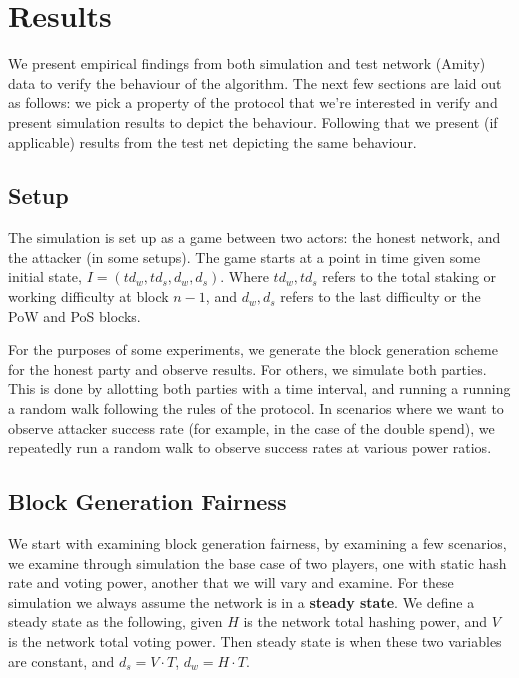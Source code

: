 \section{Results}
\label{results}

We present empirical findings from both simulation and test network (Amity) data
to verify the behaviour of the algorithm. The next few sections are laid out as
follows: we pick a property of the protocol that we're interested in verify and
present simulation results to depict the behaviour. Following that we present 
(if applicable) results from the test net depicting the same behaviour.

\subsection{Setup}

The simulation is set up as a game between two actors: the honest network, and
the attacker (in some setups). The game starts at a point in time given some initial state,
$I=(td_w,td_s,d_w,d_s)$. Where $td_w, td_s$ refers to the total staking or
working difficulty at block $n-1$, and $d_w, d_s$ refers to the last difficulty
or the PoW and PoS blocks.

For the purposes of some experiments, we generate the block generation scheme
for the honest party and observe results. For others, we simulate both parties. This
is done by allotting both parties with a time interval, and running a running a
random walk following the rules of the protocol. In scenarios where we want to
observe attacker success rate (for example, in the case of the double spend), we
repeatedly run a random walk to observe success rates at various power ratios.

\subsection{Block Generation Fairness}

We start with examining block generation fairness, by examining a few scenarios,
we examine through simulation the base case of two players, one with static
hash rate and voting power, another that we will vary and examine. For these
simulation we always assume the network is in a \textbf{steady state}. We define
a steady state as the following, given $H$ is the network total hashing power,
and $V$ is the network total voting power. Then steady state is when these two
variables are constant, and $d_s = V \cdot T$, $d_w = H \cdot T$.

